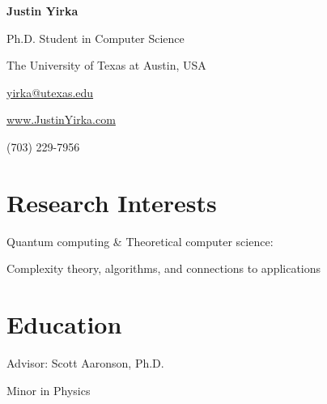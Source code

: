 \documentclass[11pt,letterpaper,serif]{moderncv}
\begin{document}

\thispagestyle{firstpage}

\begin{center}
	{\huge\textbf{Justin Yirka}}

	Ph.D. Student in Computer Science

	The University of Texas at Austin, USA

	\vspace{\baselineskip}

	\href{mailto:yirka@utexas.edu}{yirka@utexas.edu}


	\url{www.JustinYirka.com}

	(703) 229-7956
\end{center}


\setlength{\parskip}{0.4em}

\section{Research Interests}
Quantum computing \& Theoretical computer science:

\hspace{.25in} Complexity theory, algorithms, and connections to applications


\section{Education}
{
	\normalsize
	\begin{adjustwidth}{.25in}{}
		Advisor: Scott Aaronson, Ph.D.
	\end{adjustwidth}
}
\vspace{-\parskip}
{%
}
{}

\vspace{-2\parskip}
{%
}
{
	\begin{adjustwidth}{.25in}{}
		Minor in Physics %
	\end{adjustwidth}
}
\end{document}
